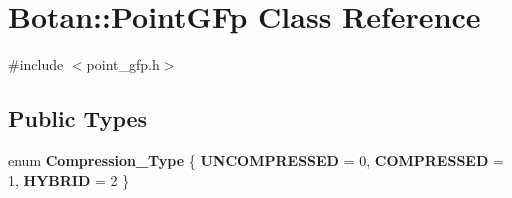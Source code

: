 \hypertarget{classBotan_1_1PointGFp}{\section{Botan\-:\-:Point\-G\-Fp Class Reference}
\label{classBotan_1_1PointGFp}
}


{\ttfamily \#include $<$point\-\_\-gfp.\-h$>$}

\subsection*{Public Types}
\begin{DoxyCompactItemize}
\item 
enum {\bfseries Compression\-\_\-\-Type} \{ {\bfseries U\-N\-C\-O\-M\-P\-R\-E\-S\-S\-E\-D} = 0, 
{\bfseries C\-O\-M\-P\-R\-E\-S\-S\-E\-D} = 1, 
{\bfseries H\-Y\-B\-R\-I\-D} = 2
 \}
\end{DoxyCompactItemize}
